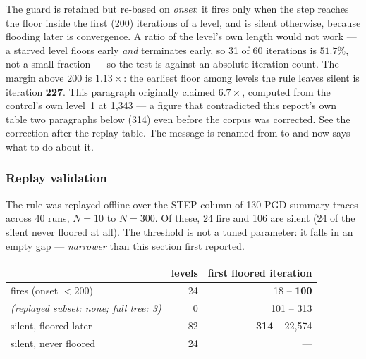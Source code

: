 \documentclass[11pt,a4paper]{article}
\begin{document}
The guard is retained but re-based on \emph{onset}: it fires only when the step
reaches the floor inside the first  (200) iterations
of a level, and is silent otherwise, because flooding later is convergence. A
ratio of the level's own length would not work --- a starved level floors early
\emph{and} terminates early, so 31 of 60 iterations is \(51.7\%\), not a small
fraction --- so the test is against an absolute iteration count. The margin above
200 is \(\mathbf{1.13\times}\): the earliest floor among levels the rule leaves
silent is iteration \textbf{227}. This paragraph originally claimed
\(6.7\times\), computed from the control's own level~1 at 1{,}343 --- a figure
that contradicted this report's own table two paragraphs below (314) even before
the corpus was corrected. See the correction after the replay table. The message
is renamed from  to  and now
says what to do about it.

\subsubsection*{Replay validation}

The rule was replayed offline over the STEP column of 130 PGD summary traces
across 40 runs, \(N{=}10\) to \(N{=}300\). Of these, 24 fire and 106 are silent
(24 of the silent never floored at all). The threshold is not a tuned parameter:
it falls in an empty gap --- \emph{narrower} than this section first reported.

\begin{center}
\small
\begin{tabular}{@{}lrr@{}}
\toprule
 & levels & first floored iteration \\
\midrule
fires (onset \(<200\))        & 24  & 18 -- \textbf{100} \\
\emph{(replayed subset: none; full tree: 3)} & 0 & 101 -- 313 \\
silent, floored later         & 82  & \textbf{314} -- 22{,}574 \\
silent, never floored         & 24  & --- \\
\bottomrule
\end{tabular}
\end{center}
\end{document}
